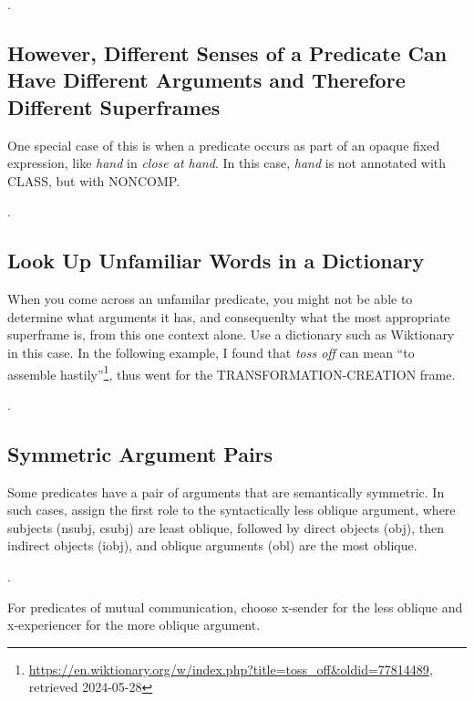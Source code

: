 \documentclass[a4paper]{article}
\newcommand{\fr}[1]{\textsf{#1}}
\newcommand{\rl}[1]{\textsf{#1}}
\begin{document}
\ex.\label{ex:chase2}


\newpage\subsection{However, Different Senses of a Predicate Can Have Different Arguments and Therefore Different Superframes}

One special case of this is when a predicate occurs as part of an opaque fixed
expression, like \emph{hand} in \emph{close at hand}. In this case, \emph{hand}
is not annotated with \fr{CLASS}, but with \fr{NONCOMP}.

\ex.


\newpage\subsection{Look Up Unfamiliar Words in a Dictionary}

When you come across an unfamilar predicate, you might not be able to determine
what arguments it has, and consequenlty what the most appropriate superframe is,
from this one context alone. Use a dictionary such as Wiktionary in this case.
In the following example, I found that \emph{toss off} can mean ``to assemble
hastily''\footnote{\url{https://en.wiktionary.org/w/index.php?title=toss\_off\&oldid=77814489}, retrieved 2024-05-28},
thus went for the \fr{TRANSFORMATION-CREATION} frame.

\ex.


\newpage\subsection{Symmetric Argument Pairs}

Some predicates have a pair of arguments that are semantically symmetric. In
such cases, assign the first role to the syntactically less oblique argument,
where subjects (\rl{nsubj}, \rl{csubj}) are least oblique, followed by direct
objects (\rl{obj}), then indirect objects (\rl{iobj}), and oblique arguments
(\rl{obl}) are the most oblique.

\ex.

For predicates of mutual communication, choose \rl{x-sender} for the less
oblique and \rl{x-experiencer} for the more oblique argument.
\end{document}
